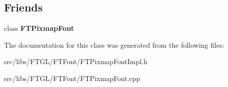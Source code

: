 \subsection*{Friends}
\begin{DoxyCompactItemize}
\item 
\hypertarget{class_f_t_pixmap_font_impl_ac7f382db9ff9f02888b67b7434d7edd4}{
class {\bfseries FTPixmapFont}}
\label{class_f_t_pixmap_font_impl_ac7f382db9ff9f02888b67b7434d7edd4}

\end{DoxyCompactItemize}


The documentation for this class was generated from the following files:\begin{DoxyCompactItemize}
\item 
src/libs/FTGL/FTFont/FTPixmapFontImpl.h\item 
src/libs/FTGL/FTFont/FTPixmapFont.cpp\end{DoxyCompactItemize}
